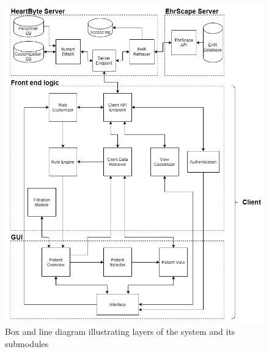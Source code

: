 \documentclass{scrreprt}
\begin{document}
\begin{figure}[htp]
    \centering
    \includegraphics[width=15cm]{architecture.png}
    \caption{Box and line diagram illustrating layers of the system and its submodules}
    \label{fig: boxAndLineDiag}
\end{figure}
\end{document}
